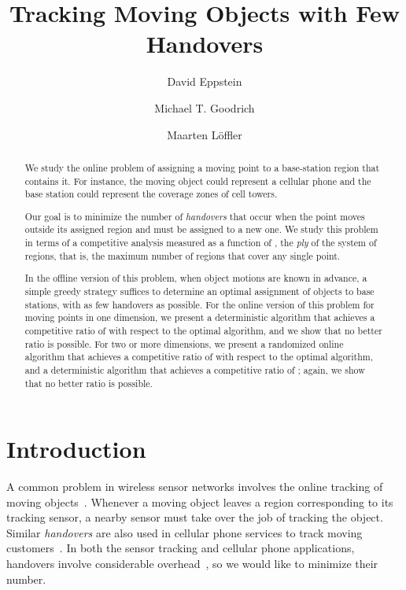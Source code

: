 \documentclass[runningheads]{llncs}
\title{Tracking Moving Objects with Few Handovers}
\author{David Eppstein \and Michael T. Goodrich \and Maarten L\"offler}
\institute{Dept. of Computer Science, Univ. of California, Irvine}
\date{}
\begin{document}
\maketitle

\begin {abstract}
We study the online problem of assigning a moving point 
to a base-station region that contains it. 
For instance, the moving object could represent a cellular phone and the base 
station could represent the coverage zones of 
cell towers. 

Our goal is to minimize the number of \emph{handovers} that occur when 
the point moves outside its assigned
region and must be assigned to a new one. 
We study this problem in terms of 
a competitive analysis measured
as a function of , the \emph{ply} of 
the system of regions, that is, the maximum number of regions
that cover any single point. 

In the offline version of this problem,
when object motions are known in advance, a simple greedy strategy 
suffices to determine an optimal assignment of objects to base stations, 
with as few handovers as possible. 
For the online version of this problem for
moving points in one dimension, we present a deterministic 
algorithm that achieves a competitive ratio of  with
respect to the optimal algorithm, 
and we show that no better ratio is possible. 
For two or more dimensions, we present a randomized online 
algorithm that achieves a competitive ratio of  with
respect to the optimal algorithm, and a deterministic algorithm that achieves a competitive ratio of ;
again, we show that no better ratio is possible.
\end {abstract}




\section {Introduction}
A common problem in wireless sensor networks involves the online
tracking of moving objects~\cite{aekd-tfmt-10,cysa-atdp-05,gtzts-stpea-10,hh-ttqw-05,ppk-eqttt-03,yz-mdot-09,zjr-iddsc-02}. 
Whenever a moving object leaves a region corresponding to its
tracking sensor, a nearby sensor  must take over the job of tracking the object.
Similar \emph{handovers} are also used in cellular phone services to track moving customers~\cite{tekinay1991handover}.
In both the sensor tracking and cellular phone applications, handovers involve considerable 
overhead~\cite{gtzts-stpea-10,hh-ttqw-05,ppk-eqttt-03, tekinay1991handover,zjr-iddsc-02},
so we would like to minimize their number.
\end{document}
